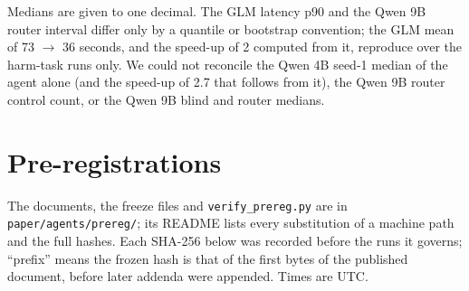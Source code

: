 \documentclass[11pt]{article}
\begin{document}
Medians are given to one decimal. The GLM latency p90 and the Qwen 9B router interval differ only by a quantile or
bootstrap convention; the GLM mean of 73 $\rightarrow$ 36 seconds, and the speed-up of 2 computed from it, reproduce over
the harm-task runs only. We could not reconcile the Qwen 4B seed-1 median of the agent alone (and the speed-up of 2.7 that
follows from it), the Qwen 9B router control count, or the Qwen 9B blind and router medians.

\section{Pre-registrations}\label{app:prereg}
The documents, the freeze files and \texttt{verify\_prereg.py} are in \texttt{paper/agents/prereg/}; its README lists
every substitution of a machine path and the full hashes. Each SHA-256 below was recorded before the runs it governs;
``prefix'' means the frozen hash is that of the first bytes of the published document, before later addenda were
appended. Times are UTC.
\end{document}
